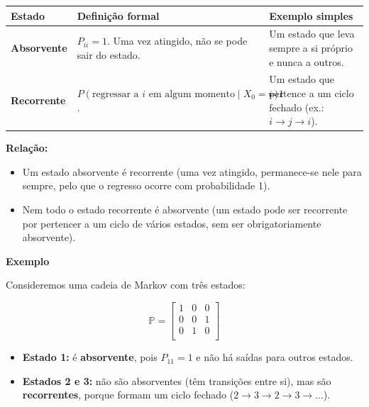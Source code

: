 \documentclass[
  11pt,
  a4paper,
]{book}
\theoremstyle{definition}
\theoremstyle{definition}
\theoremstyle{definition}
\theoremstyle{definition}
\theoremstyle{remark}
\begin{document}
\begin{longtable}[]{@{}
  >{\raggedright\arraybackslash}p{}
  >{\raggedright\arraybackslash}p{}
  >{\raggedright\arraybackslash}p{}@{}}
\toprule\noalign{}
\begin{minipage}[b]{\linewidth}\raggedright
Estado
\end{minipage} & \begin{minipage}[b]{\linewidth}\raggedright
Definição formal
\end{minipage} & \begin{minipage}[b]{\linewidth}\raggedright
Exemplo simples
\end{minipage} \\
\midrule\noalign{}
\endhead
\bottomrule\noalign{}
\endlastfoot
\textbf{Absorvente} & \(P_{ii} = 1\). Uma vez atingido, não se pode sair do estado. & Um estado que leva sempre a si próprio e nunca a outros. \\
\textbf{Recorrente} & \(P(\text{regressar a $i$ em algum momento} \mid X_0 = i) = 1\). & Um estado que pertence a um ciclo fechado (ex.: \(i \to j \to i\)). \\
\end{longtable}

\textbf{Relação:}

\begin{itemize}
\item
  Um estado absorvente é recorrente (uma vez atingido, permanece-se nele para sempre, pelo que o regresso ocorre com probabilidade 1).
\item
  Nem todo o estado recorrente é absorvente (um estado pode ser recorrente por pertencer a um ciclo de vários estados, sem ser obrigatoriamente absorvente).
\end{itemize}

\textbf{Exemplo}

Consideremos uma cadeia de Markov com três estados:

\[
\mathbb{P} =
\begin{bmatrix}
1 & 0 & 0 \\
0 & 0 & 1 \\
0 & 1 & 0 \\
\end{bmatrix}
\]

\begin{itemize}
\item
  \textbf{Estado 1:} é \textbf{absorvente}, pois \(P_{11} = 1\) e não há saídas para outros estados.
\item
  \textbf{Estados 2 e 3:} não são absorventes (têm transições entre si), mas são \textbf{recorrentes}, porque formam um ciclo fechado (\(2 \to 3 \to 2 \to 3 \to \dots\)).
\end{itemize}
\end{document}
